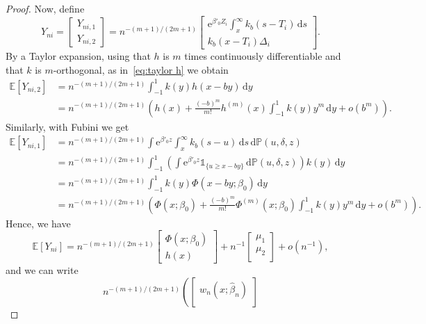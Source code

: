 \documentclass[11pt,reqno]{amsart}
\theoremstyle{definition}
\theoremstyle{plain}
\theoremstyle{remark}
\begin{document}
\begin{proof}
Now, define
\[
Y_{ni}=
\begin{bmatrix}
Y_{ni,1}\\
Y_{ni,2}
\end{bmatrix}
=
n^{-(m+1)/(2m+1)}
\begin{bmatrix}
\mathrm{e}^{\beta'_0Z_i}\int_x^{\infty}k_b(s-T_i)\,\mathrm{d}s
\\
k_b(x-T_i)\Delta_i
\end{bmatrix}.
\]
By a Taylor expansion, using that
$h$ is $m$ times continuously differentiable and that $k$ is $m$-orthogonal, as in~\eqref{eq:taylor h} we obtain
\begin{equation}
\label{eq:expec Yni2}
\begin{split}
{\mathbb{E}}\left[Y_{ni,2}\right]
&=
n^{-(m+1)/(2m+1)}
\int_{-1}^1 k(y)h(x-by)\,\mathrm{d}y\\
&=
n^{-(m+1)/(2m+1)}
\left(h(x)+\frac{(-b)^m}{m!}h^{(m)}(x)\int_{-1}^1k(y)y^m\,\mathrm{d}y + o(b^m)\right).
\end{split}
\end{equation}
Similarly, with Fubini we get
\begin{equation}
\label{eq:expec Yni1}
\begin{split}
{\mathbb{E}}\left[Y_{ni,1}\right]
&=
n^{-(m+1)/(2m+1)}
\int \mathrm{e}^{\beta'_0z}
\int_x^{\infty}k_b(s-u)\,\mathrm{d}s\,\mathrm{d}{\mathbb{P}}(u,\delta,z)\\
&=
n^{-(m+1)/(2m+1)}
\int_{-1}^1
\left(\int
\mathrm{e}^{\beta'_0z}{\mathds{1}}_{\{u\geq x-by\}}\,\mathrm{d}{\mathbb{P}}(u,\delta,z)
\right)
k(y)\,\mathrm{d}y\\
&=
n^{-(m+1)/(2m+1)}
\int_{-1}^1 k(y)\Phi(x-by;\beta_0)\,\mathrm{d}y\\
&=
n^{-(m+1)/(2m+1)}
\left(
\Phi(x;\beta_0)+\frac{(-b)^m}{m!}\Phi^{(m)}(x;\beta_0)\int_{-1}^1 k(y)y^m\,\mathrm{d}y + o(b^m)
\right).
\end{split}
\end{equation}
Hence, we have
\[
{\mathbb{E}}\left[Y_{ni}\right]
=
n^{-(m+1)/(2m+1)}
\begin{bmatrix}
\Phi(x;\beta_0)\\
h(x)
\end{bmatrix}
+
n^{-1}
\begin{bmatrix}
\mu_1 \\
\mu_2 \\
\end{bmatrix}
+
o(n^{-1}),
\]
and we can write
\[
n^{-(m+1)/(2m+1)}
\left(
\begin{bmatrix}
w_n(x;\hat\beta_n)\\

\end{bmatrix}\]
\end{proof}
\end{document}

